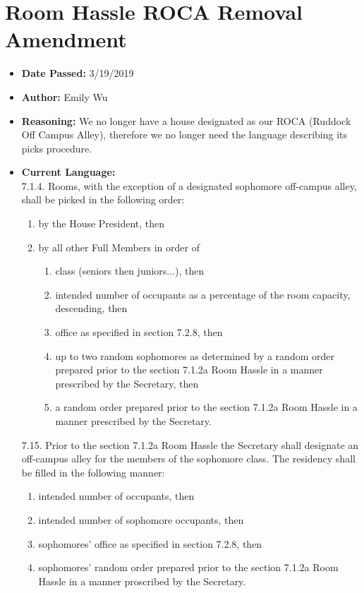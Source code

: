 \documentclass[10pt]{article} %
\begin{document}
\section{Room Hassle ROCA Removal Amendment}
\begin{itemize}
	\item \textbf{Date Passed:} 3/19/2019
	\item \textbf{Author:} Emily Wu
	\item \textbf{Reasoning:} We no longer have a house designated as our ROCA (Ruddock Off Campus Alley), therefore we no longer need the language describing its picks procedure.  
	\item \textbf{Current Language:} \\
	7.1.4. Rooms, with the exception of a designated sophomore off-campus alley, shall be picked in the following order: 
	\begin{enumerate}[label=(\alph*)]
		\item by the House President, then 
		\item by all other Full Members in order of 
		\begin{enumerate}[label=(\roman*)]
			\item class (seniors then juniors...), then 
			\item intended number of occupants as a percentage of the room capacity, descending, then 
			\item office as specified in section 7.2.8, then 
			\item up to two random sophomores as determined by a random order prepared prior to the section 7.1.2a Room Hassle in a manner prescribed by the Secretary, then 
			\item a random order prepared prior to the section 7.1.2a Room Hassle in a manner prescribed by the Secretary.
		\end{enumerate}
	\end{enumerate}
	
	7.15. Prior to the section 7.1.2a Room Hassle the Secretary shall designate an off-campus alley for the members of the sophomore class. The residency shall be filled in the following manner: 
	\begin{enumerate}[label=(\alph*)]
		\item intended number of occupants, then 
		\item intended number of sophomore occupants, then 
		\item sophomores' office as specified in section 7.2.8, then 
		\item sophomores' random order prepared prior to the section 7.1.2a Room Hassle in a manner proscribed by the Secretary. 
	\end{enumerate}
	

\end{itemize}
\end{document}
